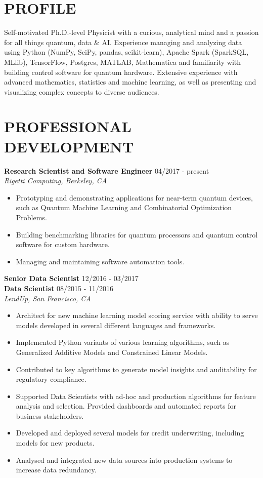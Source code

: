 \documentclass[10pt,centered]{./res} %
\begin{document}
\vspace*{-1.5cm}
\begin{resume}
\vspace{0.4cm}

\section{\color{ResumeBlue}PROFILE}
Self-motivated Ph.D.-level Physicist with a curious, analytical mind and a passion for all things quantum, data \& AI. Experience managing and analyzing data using Python (NumPy, SciPy, pandas, scikit-learn), Apache Spark (SparkSQL, MLlib), TensorFlow, Postgres, MATLAB, {\sc Mathematica} and familiarity with building control software for quantum hardware. Extensive experience with advanced mathematics, statistics and machine learning, as well as presenting and visualizing complex concepts to diverse audiences.

\section{\color{ResumeBlue}PROFESSIONAL DEVELOPMENT}
{\bf Research Scientist and Software Engineer} \hfill04/2017 - present \\
{\it Rigetti Computing, Berkeley, CA}
\begin{itemize}
  \item Prototyping and demonstrating applications for near-term quantum devices, such as Quantum Machine Learning and Combinatorial Optimization Problems.
  \item Building benchmarking libraries for quantum processors and quantum control software for custom hardware.
  \item Managing and maintaining software automation tools.
\end{itemize}

{\bf Senior Data Scientist} \hfill12/2016 - 03/2017 \\
{\bf Data Scientist} \hfill08/2015 - 11/2016 \\
{\it LendUp, San Francisco, CA}
\begin{itemize}
  \item Architect for new machine learning model scoring service with ability to serve models developed in several different languages and frameworks.
  \item Implemented Python variants of various learning algorithms, such as Generalized Additive Models and Constrained Linear Models.
  \item Contributed to key algorithms to generate model insights and auditability for regulatory compliance.
  \item Supported Data Scientists with ad-hoc and production algorithms for feature analysis and selection. Provided dashboards and automated reports for business stakeholders.
  \item Developed and deployed several models for credit underwriting, including models for new products.
  \item Analysed and integrated new data sources into production systems to increase data redundancy.
\end{itemize}


\end{resume}
\end{document}
